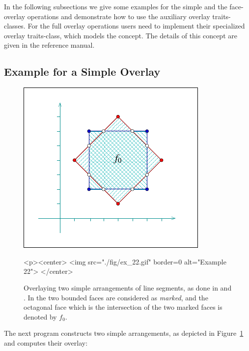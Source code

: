 In the following subsections we give some examples for the simple and the
face-overlay operations and demonstrate how to use the auxiliary overlay
traits-classes. For the full overlay operations users need to implement
their specialized overlay traits-class, which models the 
concept. The details of this concept are given in the reference manual.

\subsection{Example for a Simple Overlay}
\label{arr_ssec:simp_ovl}
%
\begin{figure}[!htp]
\begin{ccTexOnly}
  \begin{center}
  \includegraphics{Arrangement_2/fig/ex_22}
  \end{center}
\end{ccTexOnly}
\begin{ccHtmlOnly}
  <p><center>
  <img src="./fig/ex_22.gif" border=0 alt="Example 22">
  </center>
\end{ccHtmlOnly}
\caption{Overlaying two simple arrangements of line segments, as done
in  and .
In  the two bounded faces are
considered as {\em marked}, and the octagonal face which is the intersection
of the two marked faces is denoted by $f_0$.}
\label{arr_fig:ex_22}
\end{figure}

The next program constructs two simple arrangements, as depicted in
Figure~\ref{arr_fig:ex_22} and computes their overlay:

